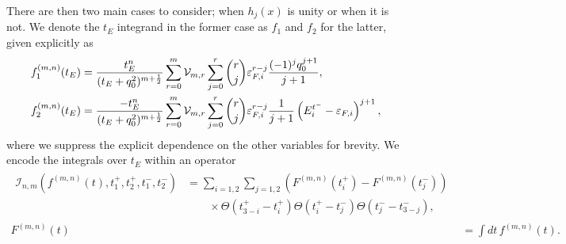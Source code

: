 There are then two main cases to consider; when $h_j(x)$ is unity or when it is not. We denote the $t_E$ integrand in the former case as $f_1$ and $f_2$ for the latter, given explicitly as
\begin{align}
    f_1^{(m,n)}(t_E) & =  \frac{t_E^n}{(t_E + q_0^2)^{m+\frac{1}{2}}}\sum_{r=0}^m \mathcal{V}_{m,r}\sum_{j = 0}^r\binom{r}{j} \varepsilon_{F,i}^{r-j}  \frac{(-1)^{j} q_0^{j+1}}{j+1},\\
    f_2^{(m,n)}(t_E) & = \frac{-t_E^n}{(t_E + q_0^2)^{m+\frac{1}{2}}}\sum_{r=0}^m \mathcal{V}_{m,r}\sum_{j = 0}^r\binom{r}{j} \varepsilon_{F,i}^{r-j}  \frac{1}{j+1} \left( E_i^{t^-} - \varepsilon_{F,i}\right)^{j+1},
\end{align}
where we suppress the explicit dependence on the other variables for brevity. We encode the integrals over $t_E$ within an operator 
\begin{align}
    \begin{split}
        \mathcal{I}_{n,m}(f^{(m,n)}(t),t_1^+,t_2^+,t_1^-,t_2^-) &= \sum_{i=1,2}\sum_{j=1,2} \left(F^{(m,n)}(t_i^+)-F^{(m,n)}(t_j^-)\right)\\
        &\hspace{2em}\times \Theta\left(t_{3-i}^+-t_i^+\right)\Theta\left(t_i^+-t_j^-\right)\Theta\left(t_j^--t_{3-j}^-\right),
    \end{split}\\
    F^{(m,n)}(t) &= \int dt \, f^{(m,n)}(t).
\end{align}

